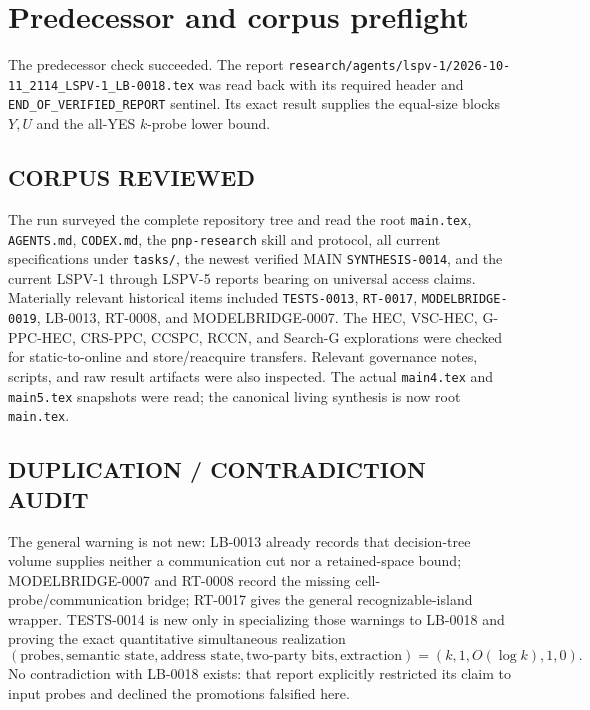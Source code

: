 \documentclass[11pt]{article}
\begin{document}
\section{Predecessor and corpus preflight}

The predecessor check succeeded.  The report
\texttt{research/agents/lspv-1/2026-10-11\_2114\_LSPV-1\_LB-0018.tex}
was read back with its required header and
\texttt{END\_OF\_VERIFIED\_REPORT} sentinel.  Its exact result supplies the
equal-size blocks $Y,U$ and the all-YES $k$-probe lower bound.

\subsection*{CORPUS REVIEWED}
The run surveyed the complete repository tree and read the root
\texttt{main.tex}, \texttt{AGENTS.md}, \texttt{CODEX.md}, the
\texttt{pnp-research} skill and protocol, all current specifications under
\texttt{tasks/}, the newest verified MAIN
\texttt{SYNTHESIS-0014}, and the current LSPV-1 through LSPV-5 reports bearing
on universal access claims.  Materially relevant historical items included
\texttt{TESTS-0013}, \texttt{RT-0017}, \texttt{MODELBRIDGE-0019}, LB-0013,
RT-0008, and MODELBRIDGE-0007.  The HEC, VSC-HEC, G-PPC-HEC, CRS-PPC, CCSPC,
RCCN, and Search-G explorations were checked for static-to-online and
store/reacquire transfers.  Relevant governance notes, scripts, and raw result
artifacts were also inspected.  The actual \texttt{main4.tex} and
\texttt{main5.tex} snapshots were read; the canonical living synthesis is now
root \texttt{main.tex}.

\subsection*{DUPLICATION / CONTRADICTION AUDIT}
The general warning is not new: LB-0013 already records that decision-tree
volume supplies neither a communication cut nor a retained-space bound;
MODELBRIDGE-0007 and RT-0008 record the missing cell-probe/communication
bridge; RT-0017 gives the general recognizable-island wrapper.  TESTS-0014 is
new only in specializing those warnings to LB-0018 and proving the exact
quantitative simultaneous realization
\[
  (\text{probes},\text{semantic state},\text{address state},
    \text{two-party bits},\text{extraction})
  =(k,1,O(\log k),1,0).
\]
No contradiction with LB-0018 exists: that report explicitly restricted its
claim to input probes and declined the promotions falsified here.
\end{document}
